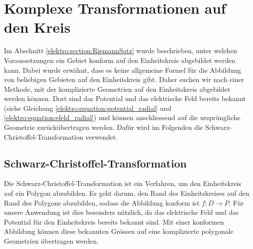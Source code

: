 %
%
%
%

\section{Komplexe Transformationen auf den Kreis
\label{elektro:section:KreisTrafo}}
%

Im Abschnitt \ref{elektro:section:RiemannSatz} wurde beschrieben, unter welchen Voraussetzungen ein Gebiet konform auf den Einheitskreis abgebildet werden kann.
Dabei wurde erwähnt, dass es keine allgemeine Formel für die Abbildung von beliebigen Gebieten auf den Einheitskreis gibt.
Daher suchen wir nach einer Methode, mit der komplizierte Geometrien auf den Einheitskreis abgebildet werden können.
Dort sind das Potential und das elektrische Feld bereits bekannt (siehe Gleichung \eqref{elektro:equation:potential_radial} und \eqref{elektro:equation:efeld_radial}) und können anschliessend auf die ursprüngliche Geometrie zurückübertragen werden.
Dafür wird im Folgenden die Schwarz-Christoffel-Transformation verwendet.

\subsection{Schwarz-Christoffel-Transformation
\label{elektro:section:SchwarzChristoffel}}
Die Schwarz-Christoffel-Transformation ist ein Verfahren, um den Einheitskreis auf ein Polygon abzubilden.
Es geht darum, den Rand des Einheitskreises auf den Rand des Polygons abzubilden, sodass die Abbildung konform ist $f\colon D \rightarrow P$.
Für unsere Anwendung ist dies besonders nützlich, da das elektrische Feld und das Potential für den Einheitskreis bereits bekannt sind.
Mit einer konformen Abbildung können diese bekannten Grössen auf eine komplizierte polygonale Geometrien übertragen werden.



